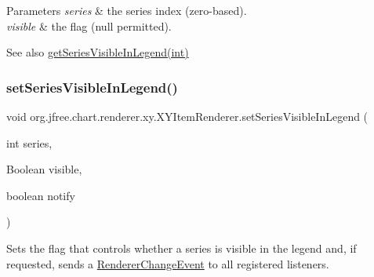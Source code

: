 \begin{DoxyParams}{Parameters}
{\em series} & the series index (zero-\/based). \\
\hline
{\em visible} & the flag ({\ttfamily null} permitted).\\
\hline
\end{DoxyParams}
\begin{DoxySeeAlso}{See also}
\mbox{\hyperlink{interfaceorg_1_1jfree_1_1chart_1_1renderer_1_1xy_1_1_x_y_item_renderer_a97403e6361d393a47b63139499d71b06}{get\+Series\+Visible\+In\+Legend(int)}} 
\end{DoxySeeAlso}
\mbox{\label{interfaceorg_1_1jfree_1_1chart_1_1renderer_1_1xy_1_1_x_y_item_renderer_a65cda07d5010b28e7778efe3c87690f8}} 
\subsubsection{\texorpdfstring{set\+Series\+Visible\+In\+Legend()}{setSeriesVisibleInLegend()}\hspace{0.1cm}{\footnotesize\ttfamily [2/4]}}
{\footnotesize\ttfamily void org.\+jfree.\+chart.\+renderer.\+xy.\+X\+Y\+Item\+Renderer.\+set\+Series\+Visible\+In\+Legend (\begin{DoxyParamCaption}\item[{int}]{series,  }\item[{Boolean}]{visible,  }\item[{boolean}]{notify }\end{DoxyParamCaption})}

Sets the flag that controls whether a series is visible in the legend and, if requested, sends a \mbox{\hyperlink{}{Renderer\+Change\+Event}} to all registered listeners.


